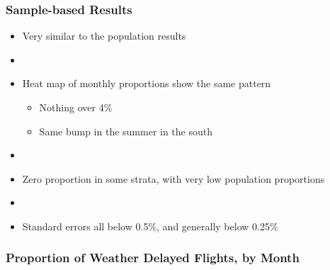 \documentclass{beamer}
\begin{document}
\begin{frame}
\frametitle{Sample-based Results}
\begin{itemize}

\item Very similar to the population results

\item[]

\item Heat map of monthly proportions show the same pattern
\begin{itemize}
\item Nothing over 4\%
\item Same bump in the summer in the south
\end{itemize}

\item[]

\item Zero proportion in some strata, with very low population proportions

\item[]

\item Standard errors all below 0.5\%, and generally below 0.25\%


\end{itemize}
\end{frame}





\begin{frame}
\frametitle{Proportion of Weather Delayed Flights, by Month}
\begin{center}
\end{center}
\end{frame}
\end{document}
